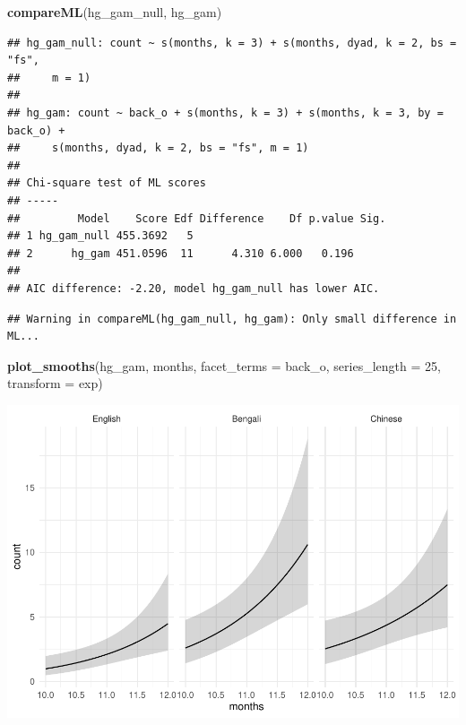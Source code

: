 \documentclass[]{article}
\newenvironment{Shaded}{\begin{snugshade}}{\end{snugshade}}
\newcommand{\DataTypeTok}[1]{\textcolor[rgb]{0.13,0.29,0.53}{#1}}
\newcommand{\DecValTok}[1]{\textcolor[rgb]{0.00,0.00,0.81}{#1}}
\newcommand{\KeywordTok}[1]{\textcolor[rgb]{0.13,0.29,0.53}{\textbf{#1}}}
\newcommand{\NormalTok}[1]{#1}
\begin{document}
\begin{Shaded}
\begin{Highlighting}[]
\KeywordTok{compareML}\NormalTok{(hg_gam_null, hg_gam)}
\end{Highlighting}
\end{Shaded}

\begin{verbatim}
## hg_gam_null: count ~ s(months, k = 3) + s(months, dyad, k = 2, bs = "fs", 
##     m = 1)
## 
## hg_gam: count ~ back_o + s(months, k = 3) + s(months, k = 3, by = back_o) + 
##     s(months, dyad, k = 2, bs = "fs", m = 1)
## 
## Chi-square test of ML scores
## -----
##         Model    Score Edf Difference    Df p.value Sig.
## 1 hg_gam_null 455.3692   5                              
## 2      hg_gam 451.0596  11      4.310 6.000   0.196     
## 
## AIC difference: -2.20, model hg_gam_null has lower AIC.
\end{verbatim}

\begin{verbatim}
## Warning in compareML(hg_gam_null, hg_gam): Only small difference in ML...
\end{verbatim}

\begin{Shaded}
\begin{Highlighting}[]
\KeywordTok{plot_smooths}\NormalTok{(hg_gam, months, }\DataTypeTok{facet_terms =}\NormalTok{ back_o, }\DataTypeTok{series_length =} \DecValTok{25}\NormalTok{, }\DataTypeTok{transform =}\NormalTok{ exp)}
\end{Highlighting}
\end{Shaded}

\includegraphics{supplement_files/figure-latex/hg-gam-plot-1.pdf}
\end{document}
